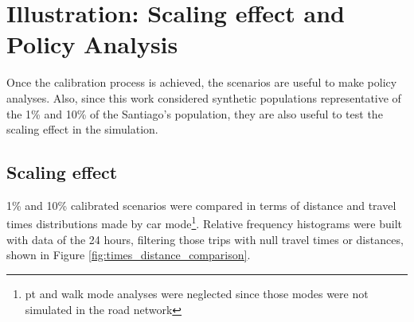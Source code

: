 \documentclass[Journal,letterpaper]{ascelike-new}
\begin{document}
\section{Illustration: Scaling effect and Policy Analysis}
Once the calibration process is achieved, the scenarios are useful to make policy analyses. Also, since this work considered synthetic populations representative of the 1\% and 10\% of the Santiago's population, they are also useful to test the scaling effect in the simulation.
\subsection{Scaling effect}
\label{sect:scaling_effect}
1\% and 10\% calibrated scenarios were compared in terms of distance and travel times distributions made by car mode\footnote{pt and walk mode analyses were neglected since those modes were not simulated in the road network}. Relative frequency histograms were built with data of the 24 hours, filtering those trips with null travel times or distances, shown in Figure \ref{fig:times_distance_comparison}. 
\end{document}
